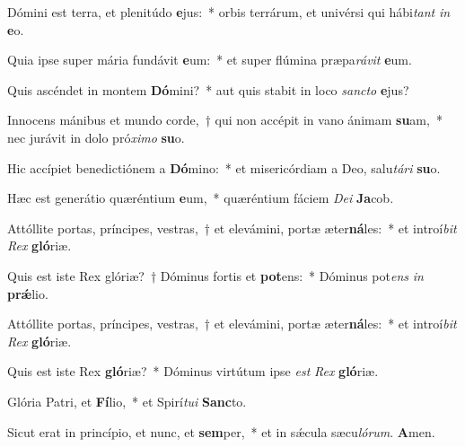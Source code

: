 \item Dómini est terra, et plenitúdo \textbf{e}jus:~* orbis terrárum, et univérsi qui hábi\textit{tant} \textit{in} \textbf{e}o.
\item Quia ipse super mária fundávit \textbf{e}um:~* et super flúmina præpa\textit{rá}\textit{vit} \textbf{e}um.
\item Quis ascéndet in montem \textbf{Dó}mini?~* aut quis stabit in loco \textit{sanc}\textit{to} \textbf{e}jus?
\item Innocens mánibus et mundo corde,~† qui non accépit in vano ánimam \textbf{su}am,~* nec jurávit in dolo pró\textit{xi}\textit{mo} \textbf{su}o.
\item Hic accípiet benedictiónem a \textbf{Dó}mino:~* et misericórdiam a Deo, salu\textit{tá}\textit{ri} \textbf{su}o.
\item Hæc est generátio quæréntium \textbf{e}um,~* quæréntium fáciem \textit{De}\textit{i} \textbf{Ja}cob.
\item Attóllite portas, príncipes, vestras,~† et elevámini, portæ æter\textbf{ná}les:~* et introí\textit{bit} \textit{Rex} \textbf{gló}riæ.
\item Quis est iste Rex glóriæ?~† Dóminus fortis et \textbf{pot}ens:~* Dóminus pot\textit{ens} \textit{in} \textbf{prǽ}lio.
\item Attóllite portas, príncipes, vestras,~† et elevámini, portæ æter\textbf{ná}les:~* et introí\textit{bit} \textit{Rex} \textbf{gló}riæ.
\item Quis est iste Rex \textbf{gló}riæ?~* Dóminus virtútum ipse \textit{est} \textit{Rex} \textbf{gló}riæ.
\item Glória Patri, et \textbf{Fí}lio,~* et Spirí\textit{tu}\textit{i} \textbf{Sanc}to.
\item Sicut erat in princípio, et nunc, et \textbf{sem}per,~* et in sǽcula sæcu\textit{ló}\textit{rum}. \textbf{A}men.
